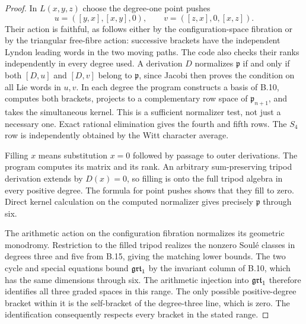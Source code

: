 \begin{proof}
In $L(x,y,z)$ choose the degree-one point pushes
\[
 u=([y,x],[x,y],0),\qquad
 v=([z,x],0,[x,z]).
\]
Their action is faithful, as follows either by the
configuration-space fibration or by the triangular
free-fibre action: successive brackets have the
independent Lyndon leading words in the two moving
paths. The code also checks their ranks independently
in every degree used. A derivation $D$ normalizes
$\mathfrak p$ if and only if both $[D,u]$ and $[D,v]$
belong to $\mathfrak p$, since Jacobi then proves the
condition on all Lie words in $u,v$. In each degree
the program constructs a basis of B.10, computes both
brackets, projects to a complementary row space of
$\mathfrak p_{n+1}$, and takes the simultaneous kernel.
This is a sufficient normalizer test, not just a
necessary one. Exact rational elimination gives the
fourth and fifth rows. The $S_4$ row is independently
obtained by the Witt character average.

Filling $x$ means substitution $x=0$ followed by passage
to outer derivations. The program computes its matrix
and its rank. An arbitrary sum-preserving tripod
derivation extends by $D(x)=0$, so filling is onto
the full tripod algebra in every positive degree.
The formula for point pushes shows that they fill
to zero. Direct kernel calculation on the computed
normalizer gives precisely $\mathfrak p$ through six.

The arithmetic action on the configuration fibration
normalizes its geometric monodromy. Restriction to the
filled tripod realizes the nonzero Soulé classes in
degrees three and five from B.15, giving the matching
lower bounds. The two cycle and special equations
bound $\mathfrak{grt}_1$ by the invariant column of B.10, which
has the same dimensions through six. The arithmetic
injection into $\mathfrak{grt}_1$ therefore identifies all three
graded spaces in this range. The only possible
positive-degree bracket within it is the self-bracket
of the degree-three line, which is zero. The
identification consequently respects every bracket
in the stated range.
\end{proof}


